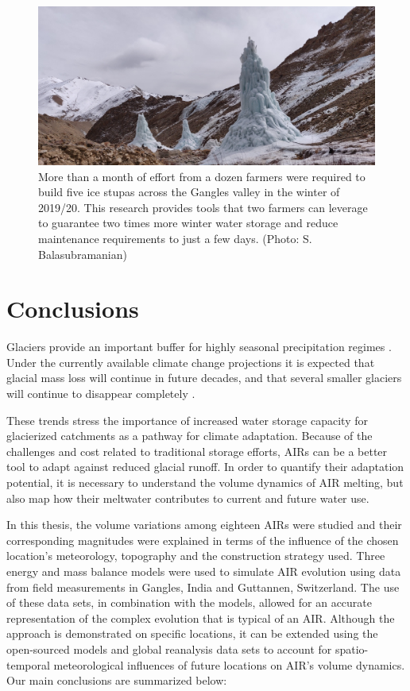 \begin{figure}[htb]
	\includegraphics[width=\textwidth]{figs/icestupa_valley}

  \caption{More than a month of effort from a dozen farmers were required to build five ice stupas across the
  Gangles valley in the winter of 2019/20. This research provides tools that two farmers can leverage to
  guarantee two times more winter water storage and reduce maintenance requirements to just a few days. (Photo:
  S. Balasubramanian)}

	\label{fig:icestupa_valley}
\end{figure}

\section{Conclusions}

Glaciers provide an important buffer for highly seasonal precipitation regimes
\citep{kaserContributionPotentialGlaciers2010}. Under the currently available climate change projections it is
expected that glacial mass loss will continue in future decades, and that several smaller glaciers will continue
to disappear completely \citep{rabatelCurrentStateGlaciers2013}.

These trends stress the importance of increased water storage capacity for glacierized catchments as a pathway
for climate adaptation. Because of the challenges and cost related to traditional storage efforts, \ac{AIRs} can
be a better tool to adapt against reduced glacial runoff. In order to quantify their adaptation potential, it is
necessary to understand the volume dynamics of AIR melting, but also map how their meltwater contributes to
current and future water use. 

In this thesis, the volume variations among eighteen \ac{AIRs} were studied and their corresponding magnitudes
were explained in terms of the influence of the chosen location's meteorology, topography and the construction
strategy used. Three energy and mass balance models were used to simulate AIR evolution using data from field
measurements in Gangles, India and Guttannen, Switzerland. The use of these data sets, in combination with the
models, allowed for an accurate representation of the complex evolution that is typical of an AIR.  Although the
approach is demonstrated on specific locations, it can be extended using the open-sourced models and global
reanalysis data sets to account for spatio-temporal meteorological influences of future locations on AIR's
volume dynamics. Our main conclusions are summarized below:

